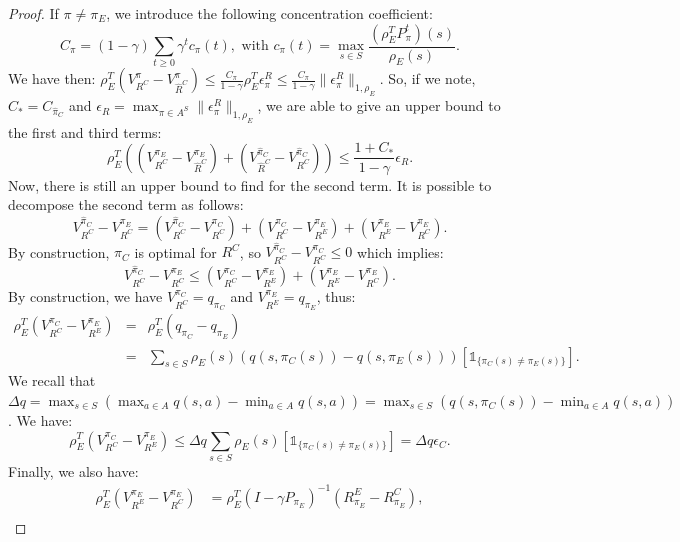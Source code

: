 \documentclass[smallextended]{svjour3}
\begin{document}
\begin{proof}
If $\pi\neq\pi_E$, we introduce the following concentration coefficient:
\begin{equation}
C_{\pi}=(1-\gamma)\sum_{t\geq0}\gamma^tc_{\pi}(t), \text{ with } c_{\pi}(t)=\max_{s\in S}\frac{(\rho_E^TP^t_\pi)(s)}{\rho_E(s)}.
\end{equation}
We have then: $\rho_E^T(V^{\pi}_{R^C}-V^{\pi}_{\hat{R}^C})\leq\frac{C_\pi}{1-\gamma}\rho_E^T\epsilon^R_{\pi}\leq\frac{C_\pi}{1-\gamma}\|\epsilon^R_{\pi}\|_{1,\rho_E}$. So, if we note, $C_*=C_{\hat{\pi}_C}$ and $\epsilon_R=\max_{\pi\in A^S}\|\epsilon_\pi^R\|_{1,\rho_E}$, we are able to give an upper bound to the first and third terms:
\begin{equation}
\rho_E^T((V^{\pi_E}_{R^C}-V^{\pi_E}_{\hat{R}^C})+(V^{\hat{\pi}_C}_{\hat{R}^C}-V^{\hat{\pi}_C}_{R^C}))\leq\frac{1+C_*}{1-\gamma}\epsilon_R.
\end{equation}
Now, there is still an upper bound to find for the second term. It is possible to decompose the second term as follows:
\begin{equation}
V^{\hat{\pi}_C}_{R^C}-V^{\pi_E}_{R^C}=(V^{\hat{\pi}_C}_{R^C}-V^{\pi_C}_{R^C})+(V^{\pi_C}_{R^C}-V^{\pi_E}_{R^E})+(V^{\pi_E}_{R^E}-V^{\pi_E}_{R^C}).
\end{equation}
By construction, $\pi_C$ is optimal for $R^C$, so $V^{\hat{\pi}_C}_{R^C}-V^{\pi_C}_{R^C}\leq0$ which implies:
\begin{equation}
V^{\hat{\pi}_C}_{R^C}-V^{\pi_E}_{R^C}\leq(V^{\pi_C}_{R^C}-V^{\pi_E}_{R^E})+(V^{\pi_E}_{R^E}-V^{\pi_E}_{R^C}).
\end{equation}
By construction, we have $V^{\pi_C}_{R^C}=q_{\pi_C}$ and $V^{\pi_E}_{R^E}=q_{\pi_E}$, thus:
\begin{eqnarray}
\rho_E^T(V^{\pi_C}_{R^C}-V^{\pi_E}_{R^E})&=&\rho_E^T(q_{\pi_C}-q_{\pi_E})\\
&=&\sum_{s\in S}\rho_E(s)(q(s,\pi_C(s))-q(s,\pi_E(s)))[\mathds{1}_{\{\pi_C(s)\neq\pi_E(s)\}}].
\end{eqnarray}
We recall that $\Delta q=\max_{s\in S}(\max_{a\in A}q(s,a)-\min_{a\in A}q(s,a))=\max_{s\in S}(q(s,\pi_C(s))-\min_{a\in A}q(s,a))$. We have:
\begin{equation}
\rho_E^T(V^{\pi_C}_{R^C}-V^{\pi_E}_{R^E})\leq\Delta q\sum_{s\in S}\rho_E(s)[\mathds{1}_{\{\pi_C(s)\neq\pi_E(s)\}}]= \Delta q \epsilon_C.
\end{equation}
Finally, we also have:
\begin{align}
\rho_E^T(V^{\pi_E}_{R^E}-V^{\pi_E}_{R^C})&=\rho_E^T(I-\gamma P_{\pi_E})^{-1}(R^E_{\pi_E}-R^C_{\pi_E}),
\\

\end{align}
\end{proof}
\end{document}
